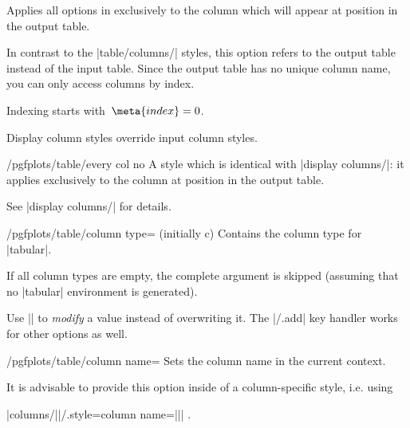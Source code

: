 \begin{pgfplotstabledisplaycolumnkey}
	Applies all options in  exclusively to the column which will appear at position  in the output table.

	In contrast to the |table/columns/| styles, this option refers to the output table instead of the input table. Since the output table has no unique column name, you can only access columns by index.

	Indexing starts with~$\meta{index}=0$.

	Display column styles override input column styles.
\end{pgfplotstabledisplaycolumnkey}

\begin{stylekey}{/pgfplots/table/every col no }
	A style which is identical with |display columns/|: it applies exclusively to the column at position  in the output table.

	See |display columns/| for details.
\end{stylekey}

\begin{key}{/pgfplots/table/column type= (initially c)}
	Contains the column type for |tabular|. 
	
	If all column types are empty, the complete argument is skipped (assuming that no |tabular| environment is generated).

	Use || to \emph{modify} a value instead of overwriting it. The |/.add| key handler works for other options as well.
\begin{codeexample}[narrow]
\end{codeexample}
\end{key}

\begin{key}{/pgfplots/table/column name=}
	Sets the column name in the current context.

	It is advisable to provide this option inside of a column-specific style, i.e. using
	
	|columns/||/.style={column name=||}| .
\end{key}


